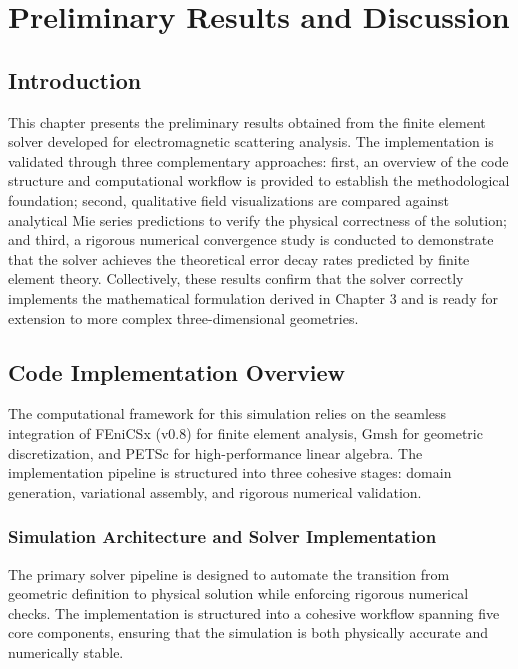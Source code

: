 \documentclass[class=report, crop=false]{standalone}
\begin{document}
\chapter{Preliminary Results and Discussion}

\section{Introduction}

This chapter presents the preliminary results obtained from the finite element solver developed for electromagnetic scattering analysis. The implementation is validated through three complementary approaches: first, an overview of the code structure and computational workflow is provided to establish the methodological foundation; second, qualitative field visualizations are compared against analytical Mie series predictions to verify the physical correctness of the solution; and third, a rigorous numerical convergence study is conducted to demonstrate that the solver achieves the theoretical error decay rates predicted by finite element theory. Collectively, these results confirm that the solver correctly implements the mathematical formulation derived in Chapter 3 and is ready for extension to more complex three-dimensional geometries.

\section{Code Implementation Overview}

The computational framework for this simulation relies on the seamless integration of FEniCSx (v0.8) for finite element analysis, Gmsh for geometric discretization, and PETSc for high-performance linear algebra. The implementation pipeline is structured into three cohesive stages: domain generation, variational assembly, and rigorous numerical validation.

\subsection{Simulation Architecture and Solver Implementation}

The primary solver pipeline is designed to automate the transition from geometric definition to physical solution while enforcing rigorous numerical checks. The implementation is structured into a cohesive workflow spanning five core components, ensuring that the simulation is both physically accurate and numerically stable.
\end{document}
